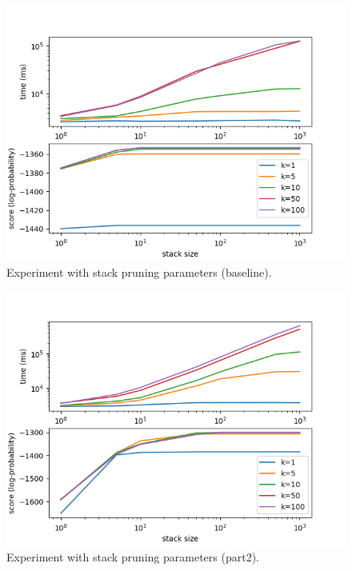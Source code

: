 \documentclass[answers]{exam}
\begin{document}

\begin{figure}
  \centering
  \includegraphics{fig-default}
  \caption[Experiment (baseline).]{Experiment with stack pruning parameters
    (baseline).}
  \label{fig:exp-baseline}
\end{figure}

\begin{figure}
  \centering
  \includegraphics{fig-part2}
  \caption[Experiment (part2).]{Experiment with stack pruning parameters
    (part2).}
  \label{fig:exp-part2}
\end{figure}
\end{document}
